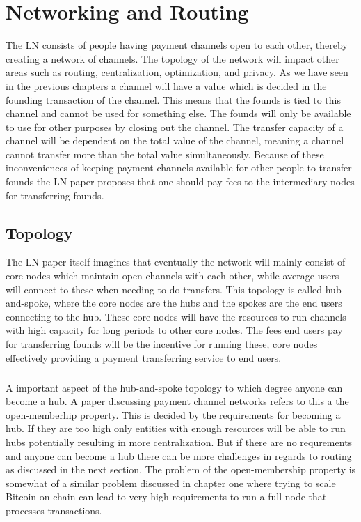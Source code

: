 \documentclass[informationsecurity]{gucmasterproject}
\begin{document}
\chapter{Networking and Routing}

The LN consists of people having payment channels open to each other, thereby creating a network of channels. The topology of the network will impact other areas such as routing, centralization, optimization, and privacy.  As we have seen in the previous chapters a channel will have a value which is decided in the founding transaction of the channel. This means that  the founds is tied to this channel and cannot be used for something else. The founds will only be available to use for other purposes by closing out the channel. The transfer capacity of a channel will be dependent on the total value of the channel, meaning a channel cannot transfer more than the total value simultaneously. Because of these inconveniences of keeping payment channels available for other people to transfer founds the LN paper\cite{poon2015bitcoin} proposes that one should pay fees to the intermediary nodes for transferring founds. 

\section{Topology}
The LN paper itself\cite{poon2015bitcoin} imagines that eventually the network will mainly consist of core nodes which maintain open channels with each other, while average users will connect to these when needing to do transfers. This topology is called hub-and-spoke, where the core nodes are the hubs and the spokes are the end users connecting to the hub. These core nodes will have the resources to run channels with high capacity for long periods to other core nodes. The fees end users pay for transferring founds will be the incentive for running these, core nodes effectively providing a payment transferring service to end users. 

\paragraph{}
A important aspect of the hub-and-spoke topology to which degree anyone can become a hub.
A paper discussing payment channel networks\cite{mccorry2016towards} refers to this a the open-memberhip property.
This is decided by the requirements for becoming a hub. 
If they are too high only entities with enough resources will be able to run hubs potentially resulting in more centralization.
But if there are no requrements and anyone can become a hub there can be more challenges in regards to routing as discussed in the next section. The problem of the open-membership property is somewhat of a similar problem discussed in chapter one where trying to scale Bitcoin on-chain can lead to very high requirements to run a full-node that processes transactions. 
\end{document}
